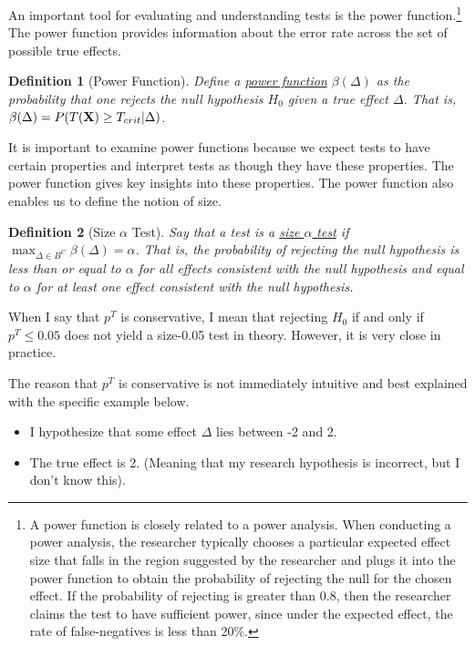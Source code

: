 \documentclass[12pt]{article}
\newtheorem{mydef}{Definition}
\begin{document}
An important tool for evaluating and understanding tests is the power function.\footnote{A power function is closely related to a power analysis. When conducting a power analysis, the researcher typically chooses a particular expected effect size that falls in the region suggested by the researcher and plugs it into the power function to obtain the probability of rejecting the null for the chosen effect. If the probability of rejecting is greater than 0.8, then the researcher claims the test to have sufficient power, since under the expected effect, the rate of false-negatives is less than 20\%.} The power function provides information about the error rate across the set of possible true effects. \begin{mydef}[Power Function]
Define a \underline{power function} $\beta(\Delta)$ as the probability that one rejects the null hypothesis $H_0$ given a true effect $\Delta$. That is, $\beta(\Delta) = P(T({\bf X}) \geq T_{crit}|\Delta)$.
\end{mydef}
It is important to examine power functions because we expect tests to have certain properties and interpret tests as though they have these properties. The power function gives key insights into these properties. The power function also enables us to define the notion of size.
\begin{mydef}[Size $\alpha$ Test]
Say that a test is a \underline{size $\alpha$ test} if $\displaystyle \max_{\Delta \in B^C} \beta{(\Delta)} = \alpha$. That is, the probability of rejecting the null hypothesis is less than or equal to $\alpha$ for all effects consistent with the null hypothesis and equal to $\alpha$ for at least one effect consistent with the null hypothesis.
\end{mydef}

When I say that $p^T$ is conservative, I mean that rejecting $H_0$ if and only if $p^T \leq 0.05$ does not yield a size-0.05 test in theory. However, it is very close in practice.

The reason that $p^T$ is conservative is not immediately intuitive and best explained with the specific example below. 

\begin{itemize}
\item I hypothesize that some effect $\Delta$ lies between -2 and 2.
\item The true effect is 2. (Meaning that my research hypothesis is incorrect, but I don't know this).
\end{itemize}
\end{document}

